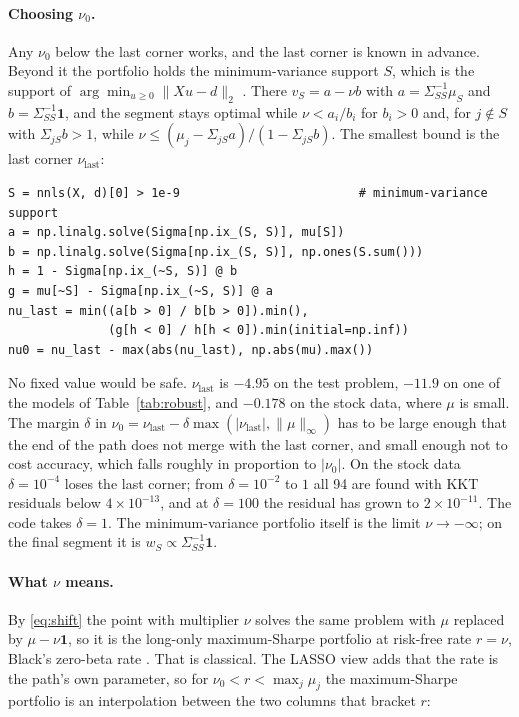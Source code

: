 \documentclass[11pt]{article}
\newcommand{\Sig}{\Sigma}
\begin{document}
\paragraph{Choosing $\nu_0$.} Any $\nu_0$ below the last corner works, and the last
corner is known in advance. Beyond it the portfolio holds the minimum-variance support
$S$, which is the support of $\arg\min_{u\ge0}\|Xu-d\|_2$ \cite{lawson1974}. There
$v_S=a-\nu b$ with $a=\Sig_{SS}^{-1}\mu_S$ and $b=\Sig_{SS}^{-1}\mathbf 1$, and the
segment stays optimal while $\nu<a_i/b_i$ for $b_i>0$ and, for $j\notin S$ with
$\Sig_{jS}b>1$, while $\nu\le(\mu_j-\Sig_{jS}a)/(1-\Sig_{jS}b)$. The smallest bound is the
last corner $\nu_{\mathrm{last}}$:

\begin{lstlisting}
S = nnls(X, d)[0] > 1e-9                         # minimum-variance support
a = np.linalg.solve(Sigma[np.ix_(S, S)], mu[S])
b = np.linalg.solve(Sigma[np.ix_(S, S)], np.ones(S.sum()))
h = 1 - Sigma[np.ix_(~S, S)] @ b
g = mu[~S] - Sigma[np.ix_(~S, S)] @ a
nu_last = min((a[b > 0] / b[b > 0]).min(),
              (g[h < 0] / h[h < 0]).min(initial=np.inf))
nu0 = nu_last - max(abs(nu_last), np.abs(mu).max())
\end{lstlisting}

\noindent
No fixed value would be safe. $\nu_{\mathrm{last}}$ is $-4.95$ on the test problem,
$-11.9$ on one of the models of Table~\ref{tab:robust}, and $-0.178$ on the stock data,
where $\mu$ is small. The margin $\delta$ in $\nu_0=\nu_{\mathrm{last}}-\delta
\max(|\nu_{\mathrm{last}}|,\|\mu\|_\infty)$ has to be large enough that the end of the
path does not merge with the last corner, and small enough not to cost accuracy, which
falls roughly in proportion to $|\nu_0|$. On the stock data $\delta=10^{-4}$ loses the
last corner; from $\delta=10^{-2}$ to $1$ all 94 are found with KKT residuals below
$4\times10^{-13}$, and at $\delta=100$ the residual has grown to $2\times10^{-11}$. The
code takes $\delta=1$. The minimum-variance portfolio itself is the limit $\nu\to-\infty$; on the
final segment it is $w_S\propto\Sig_{SS}^{-1}\mathbf 1$.

\paragraph{What $\nu$ means.} By \eqref{eq:shift} the point with multiplier $\nu$ solves
the same problem with $\mu$ replaced by $\mu-\nu\mathbf 1$, so it is the long-only
maximum-Sharpe portfolio at risk-free rate $r=\nu$, Black's zero-beta rate
\cite{black1972}. That is classical. The LASSO view adds that the rate is the path's own
parameter, so for $\nu_0<r<\max_j\mu_j$ the maximum-Sharpe portfolio is an interpolation
between the two columns that bracket $r$:
\end{document}

